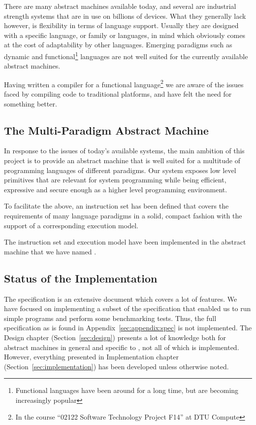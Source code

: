 There are many abstract machines available today, and several are industrial
strength systems that are in use on billions of devices. What they generally
lack however, is flexibility in terms of language support. Usually they are
designed with a specific language, or family or languages, in mind which
obviously comes at the cost of adaptability by other languages. Emerging
paradigms such as dynamic and functional\footnote{Functional languages have been
  around for a long time, but are becoming increasingly popular} languages are
not well suited for the currently available abstract machines.

Having written a compiler for a functional language\footnote{In the course
  ``02122 Software Technology Project F14'' at DTU Compute} we are aware of the
issues faced by compiling code to traditional platforms, and have felt the need
for something better.

\subsection{The Multi-Paradigm Abstract Machine}

In response to the issues of today's available systems, the main ambition of
this project is to provide an abstract machine that is well suited for a
multitude of programming languages of different paradigms. Our system exposes
low level primitives that are relevant for system programming while being
efficient, expressive and secure enough as a higher level programming
environment.

To facilitate the above, an instruction set has been defined that covers the
requirements of many language paradigms in a solid, compact fashion with the
support of a corresponding execution model.

The instruction set and execution model have been implemented in the abstract
machine that we have named \thename{}.

\subsection{Status of the Implementation}

The \thename{} specification is an extensive document which covers a lot of
features. We have focused on implementing a subset of the specification that
enabled us to run simple programs and perform some benchmarking tests. Thus, the
full specification as is found in Appendix~\ref{sec:appendix:spec} is not
implemented. The Design chapter (Section~\ref{sec:design}) presents a lot of
knowledge both for abstract machines in general and specific to \thename{}, not
all of which is implemented. However, everything presented in Implementation
chapter (Section~\ref{sec:implementation}) has been developed unless otherwise
noted.

